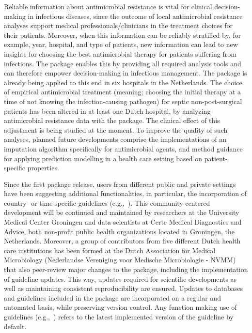 \documentclass[article, shortnames]{jss}
\newcommand{\fct}[1]{\code{#1()}}
\begin{document}
Reliable information about antimicrobial resistance is vital for clinical
decision-making in infectious diseases, since the outcome of local
antimicrobial resistance analyses support medical professionals/clinicians
in the treatment choices for their patients.  Moreover, when this
information can be reliably stratified by, for example, year, hospital, and
type of patients, new information can lead to new insights for choosing the
best antimicrobial therapy for patients suffering from infections.  The
 package enables this by providing all required analysis tools and
can therefore empower decision-making in infectious management.  The
 package is already being applied to this end in six hospitals in
the Netherlands.  The choice of empirical antimicrobial treatment (meaning;
choosing the initial therapy at a time of not knowing the infection-causing
pathogen) for septic non-post-surgical patients has been altered in at least
one Dutch hospital, by analyzing antimicrobial resistance data with the
 package.  The clinical effect of this adjustment is being studied
at the moment.  To improve the quality of such analyses, planned future
developments comprise the implementations of an imputation algorithm
specifically for antimicrobial agents, and method guidance for applying
prediction modelling in a health care setting based on patient-specific
properties.

Since the first package release, users from different public and private
settings have been suggesting additional functionalities, in particular, the
incorporation of country- or time-specific guidelines (e.g.,~\cite{Magiorakos2012}).
This community-centered development will be
continued and maintained by researchers at the University Medical Center
Groningen and data scientists at Certe Medical Diagnostics and Advice, both
non-profit public health organizations located in Groningen, the
Netherlands.  Moreover, a group of contributors from five different Dutch
health care institutions has been formed at the Dutch Association for
Medical Microbiology (Nederlandse Vereniging voor Medische Microbiologie -
NVMM) that also peer-review major changes to the package, including the
implementation of guideline updates.  This way, updates required for
scientific developments as well as maintaining consistent reproducibility
are ensured.  Updates to databases and guidelines included in the 
package are incorporated on a regular and automated basis, while preserving
version control.  Any function making use of guidelines (e.g.,~\fct{eucast\_rules})
refers to the latest implemented version of the
guideline by default.
\end{document}
